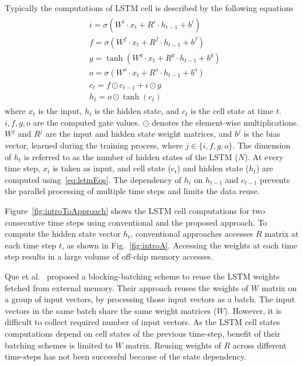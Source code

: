 \documentclass[a4paper,10pt]{article}
\begin{document}
Typically the computations of LSTM cell is described by the following equations
\begin{align}\label{eq:lstmEqs}
	\begin{split}
		&i{=}{\sigma}(W^i{\cdot}x_t{+}R^i{\cdot}h_{t-1}{+}b^i)\\
		&f{=}{\sigma}(W^f{\cdot}x_t{+}R^f{\cdot}h_{t-1}{+}b^f)\\
		&g{=}{\tanh}(W^g{\cdot}x_t{+}R^g{\cdot}h_{t-1}{+}b^g)\\
		&o{=}{\sigma}(W^o{\cdot}x_t{+}R^o{\cdot}h_{t-1}{+}b^o)\\
		&c_{t}{=}f{\odot}c_{t-1}{+}i{\odot}g\\
		&h_{t}{=}o{\odot}{\tanh}(c_t)
	\end{split}	
\end{align}
where $x_t$ is the input, $h_t$ is the hidden state, and $c_t$ is the cell state at time $t$. $i,f,g,o$ are the computed gate values. $\odot$ denotes the element-wise multiplications. $W^j$ and $R^j$ are the input and hidden state weight matrices, and $b^j$ is the bias vector, learned during the training process, where $j\in\{i,f,g,o\}$. The dimension of $h_t$ is referred to as the number of hidden states of the LSTM ($N$). 
At every time step, $x_t$ is taken as input, and cell state ($c_t$) and hidden state ($h_t$) are computed using~\eqref{eq:lstmEqs}. The dependency of $h_t$ on $h_{t-1}$ and $c_{t-1}$ prevents the parallel processing of multiple time steps and limits the data reuse. 

Figure{~\ref{fig:introToApproach}} shows the LSTM cell computations for two consecutive time steps using  conventional and the proposed approach. To compute the hidden state vector $h_t$, conventional approaches accesses $R$ matrix at each time step $t$, as shown in Fig.{~\ref{fig:introA}}. Accessing the weights at each time step results in a large volume of off-chip memory accesses. 

Que et al.~\cite{que2019efficient} proposed a blocking-batching scheme to reuse the LSTM weights fetched from external memory. Their approach reuses the weights of $W$ matrix on a group of input vectors, by processing those input vectors as a batch. The input vectors in the same batch share the same weight matrices ($W$). However, it is difficult to collect required number of input vectors. As the LSTM cell states computations depend on cell states of the previous time-step, benefit of their batching schemes is limited to $W$ matrix. Reusing weights of $R$ across different time-steps has not been successful because of the state dependency.
\end{document}
